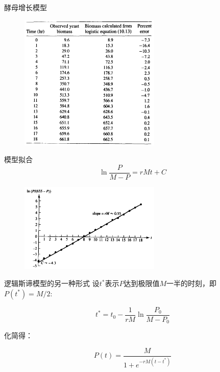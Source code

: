\documentclass[UTF8]{ctexbeamer}
\begin{document}
\begin{frame}{酵母增长模型}
  \begin{figure}
    \centering
    \includegraphics[width=0.6\textwidth]{yeast.png}
  \end{figure}
\end{frame}

\begin{frame}{模型拟合}
  \[
  \ln \frac{P}{M-P} = rMt + C
  \]

  \begin{figure}
    \centering
    \includegraphics[width=0.6\textwidth]{yp.png}
  \end{figure}
\end{frame}

\begin{frame}{逻辑斯谛模型的另一种形式}
  设$t^*$表示$P$达到极限值$M$一半的时刻，即$P(t^*) = M/2$:

  \[
  t^* = t_0 - \frac{1}{rM} \ln \frac{P_0}{M-P_0}
  \]

  化简得：

  \[
  P(t) = \frac{M}{1 + e^{-rM(t-t^*)}}
  \]
  
\end{frame}
\end{document}
